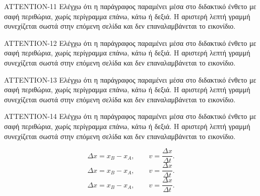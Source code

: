 \begin{AttentionBox}
ATTENTION-11 Ελέγχω ότι η παράγραφος παραμένει μέσα στο διδακτικό ένθετο με σαφή περιθώρια, χωρίς περίγραμμα επάνω, κάτω ή δεξιά. Η αριστερή λεπτή γραμμή συνεχίζεται σωστά στην επόμενη σελίδα και δεν επαναλαμβάνεται το εικονίδιο.\par
ATTENTION-12 Ελέγχω ότι η παράγραφος παραμένει μέσα στο διδακτικό ένθετο με σαφή περιθώρια, χωρίς περίγραμμα επάνω, κάτω ή δεξιά. Η αριστερή λεπτή γραμμή συνεχίζεται σωστά στην επόμενη σελίδα και δεν επαναλαμβάνεται το εικονίδιο.\par
ATTENTION-13 Ελέγχω ότι η παράγραφος παραμένει μέσα στο διδακτικό ένθετο με σαφή περιθώρια, χωρίς περίγραμμα επάνω, κάτω ή δεξιά. Η αριστερή λεπτή γραμμή συνεχίζεται σωστά στην επόμενη σελίδα και δεν επαναλαμβάνεται το εικονίδιο.\par
ATTENTION-14 Ελέγχω ότι η παράγραφος παραμένει μέσα στο διδακτικό ένθετο με σαφή περιθώρια, χωρίς περίγραμμα επάνω, κάτω ή δεξιά. Η αριστερή λεπτή γραμμή συνεχίζεται σωστά στην επόμενη σελίδα και δεν επαναλαμβάνεται το εικονίδιο.\par
\[\Delta x=x_B-x_A,\qquad v=\frac{\Delta x}{\Delta t}.\]
\[\Delta x=x_B-x_A,\qquad v=\frac{\Delta x}{\Delta t}.\]
\[\Delta x=x_B-x_A,\qquad v=\frac{\Delta x}{\Delta t}.\]
\end{AttentionBox}
\clearpage
